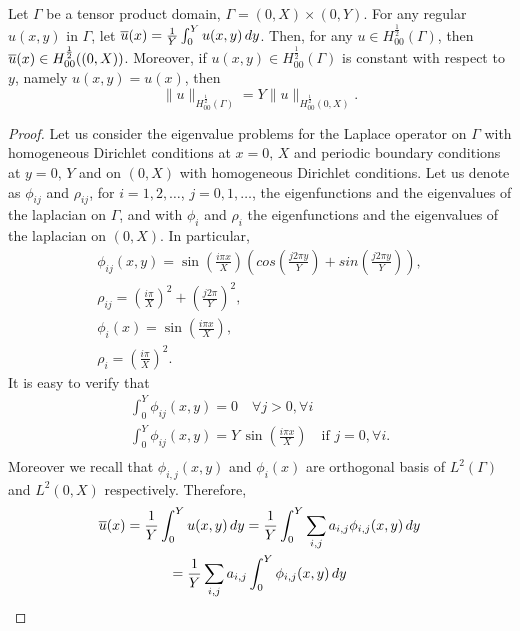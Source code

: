 \documentclass[r]{siamart171218}
\begin{document}
\begin{lemma}\label{lemma:H12norm}
Let $\Gamma$ be a tensor product domain, $\Gamma= (0,X) \times (0,Y)$. For any regular $u(x,y)$ in $\Gamma$, let $\overline{u}(x)=\frac 1Y \int _0^Y u(x,y)\, dy$. Then, for any $u\in H_{00}^{\frac 12}(\Gamma)$, then $\overline{u}(x)\in H_{00}^{\frac 12}((0,X))$. 
Moreover, if $u(x,y)\in H^{\frac 12}_{00}(\Gamma)$ is constant with respect to $y$, namely $u(x,y)=u(x)$, then 
\begin{equation*}
\|u\|_{H^{\frac 12}_{00}(\Gamma)}=Y \|u\|_{H^{\frac 12}_{00}(0,X)}.
\end{equation*}
\end{lemma}
\begin{proof}
Let us consider the eigenvalue problems for the Laplace operator on $\Gamma$ with homogeneous Dirichlet conditions at $x=0,\, X$ and periodic boundary conditions at $y=0,\, Y$ and on $(0,X)$ with homogeneous Dirichlet conditions. Let us denote as $\phi _{ij}$ and $\rho _{ij}$, for $i=1,2,\dots$, $j=0,1,\dots$, the eigenfunctions and the eigenvalues of the laplacian on $\Gamma$, and with $\phi _i$ and $\rho _i$ the eigenfunctions and the eigenvalues of the laplacian on $(0,X)$. In particular,
\begin{align*}
\phi _{ij}(x,y)=\sin \left(\frac{i\pi x}{X}\right)\left( cos\left(\frac{j2\pi y}{Y}\right)+ sin	\left(\frac{j2\pi y}{Y}\right) \right),\\
\rho_{ij}=\left(\frac{i\pi}{X}\right) ^2+\left(\frac{j2\pi}{Y}\right)^2,\\
\phi _{i}(x)=\sin \left(\frac{i\pi x}{X}\right),\\
\rho _i = \left(\frac{i\pi}{X}\right) ^2.
\end{align*}
It is easy to verify that 
\begin{eqnarray}
\label{null_int_eigenf}
\int_0^{Y} \phi _{ij}(x,y)=0 \quad \forall j>0, \forall i \\
\label{nonull_int_eigenf}
\int_0^{Y} \phi _{ij}(x,y)= Y \, \sin\left(\frac{i\pi x}{X}\right) \quad \mbox{if } j=0, \forall i  .\\
\end{eqnarray}
Moreover we recall that $\phi_{i,j}(x,y)$ and $\phi _i(x)$ are orthogonal basis of $L^2(\Gamma)$ and $L^2(0,X)$ respectively. Therefore,
\begin{multline*}
\avrc{u}(x)=\frac{1}{Y}\int_0^{Y} u(x,y)\, dy
= \frac{1}{Y}\int_0^{Y} \sum_{i,j} a_{i,j} \phi_{i,j}(x,y) \, dy
\\= \frac{1}{Y}\sum_{i,j} a_{i,j}\int_0^{Y}  \phi_{i,j}(x,y) \, dy

\end{multline*}
\end{proof}
\end{document}
